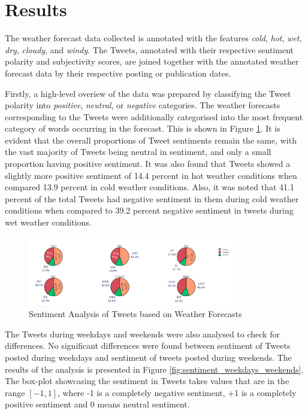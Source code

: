 \documentclass[a4paper,10pt]{article}
\begin{document}
    \section{Results}
    \label{results}

    The weather forecast data collected is annotated with the features \textit{cold}, \textit{hot}, \textit{wet}, \textit{dry}, \textit{cloudy}, and \textit{windy}. The Tweets, annotated with their respective sentiment polarity and subjectivity scores, are joined together with the annotated weather forecast data by their respective posting or publication dates.
    
    Firstly, a high-level overiew of the data was prepared by classifying the Tweet polarity into \textit{positive}, \textit{neutral}, or \textit{negative} categories. The weather forecasts corresponding to the Tweets were additionally categorised into the most frequent category of words occurring in the forecast. This is shown in Figure \ref{fig:analysis_sentiment_weather}. It is evident that the overall proportions of Tweet sentiments remain the same, with the vast majority of Tweets being neutral in sentiment, and only a small proportion having positive sentiment. It was also found that Tweets showed a slightly more positive sentiment of 14.4 percent in hot weather conditions when compared 13.9 percent in cold weather conditions. Also, it was noted that 41.1 percent of the total Tweets had negative sentiment in them during cold weather conditions when compared to 39.2 percent negative sentiment in tweets during wet weather conditions. 

    \begin{figure}
        \includegraphics[width=0.8\textwidth]{analysis_sentiment_weather.png}
        \caption{Sentiment Analysis of Tweets based on Weather Forecasts}
        \label{fig:analysis_sentiment_weather}
    \end{figure}
    
    The Tweets during weekdays and weekends were also analysed to check for differences. No significant differences were found between sentiment of Tweets posted during weekdays and sentiment of tweets posted during weekends. The results of the analysis is presented in Figure \ref{fig:sentiment_weekdays_weekends}. The box-plot showcasing the sentiment in Tweets takes values that are in the range $[-1, 1]$, where -1 is a completely negative sentiment, +1 is a completely positive sentiment and 0 means neutral sentiment.
\end{document}
